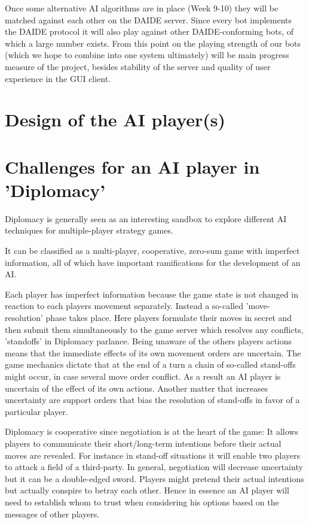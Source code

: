 \documentclass[12pt]{article}
\begin{document}
\begin{itemize}
{Once some alternative AI algorithms are in place (Week 9-10) they will be matched against
each other on the DAIDE server. Since every bot implements the DAIDE protocol
it will also play against other DAIDE-conforming bots, of which
a large number exists. From this point on the playing strength of our
bots (which we hope to combine into one system ultimately) will be main 
progress measure of the project, besides stability of the server and quality
of user experience in the GUI client.

\section{Design of the AI player(s)}

\section{Challenges for an AI player in 'Diplomacy'}

Diplomacy is generally seen as an interesting sandbox to explore
different AI techniques for multiple-player strategy games.

It can be classified as a multi-player, cooperative, zero-sum game
with imperfect information, all of which have important ramifications
for the development of an AI.

Each player has imperfect information because the game state is not
changed in reaction to each players movement separately. Instead a 
so-called 'move-resolution' phase takes place. Here players formulate
their moves in secret and then submit them simultaneously to the game
server which resolves any conflicts, 'standoffs'
in Diplomacy parlance. Being unaware of the others players actions means
that the immediate effects of its own movement orders are uncertain. The
game mechanics dictate that at the end of a turn a chain of so-called 
stand-offs might occur, in case several move order conflict. As a result
an AI player is uncertain of the effect of its own actions. Another matter
that increases uncertainty are support orders that bias the resolution of
stand-offs in favor of a particular player. 

Diplomacy is cooperative since negotiation is at the heart of the game:
It allows players to communicate their short/long-term intentions before
their actual moves are revealed. For instance in stand-off situations it will
enable two players to attack a field of a third-party. In general, negotiation
will decrease uncertainty but it can be a double-edged sword. Players might
pretend their actual intentions but actually conspire to betray each other. Hence
in essence an AI player will need to establish whom to trust when considering
his options based on the messages of other players.

}
\end{itemize}
\end{document}
